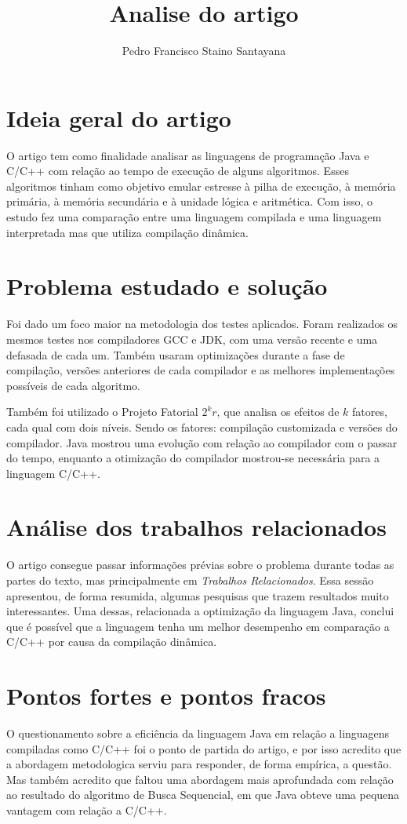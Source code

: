 \documentclass[12pt]{article}
\title{Analise do artigo}
\author{Pedro Francisco Staino Santayana}
\date{}
\begin{document}
\maketitle

\section*{Ideia geral do artigo}
O artigo\cite{inproceedings} tem como finalidade analisar as linguagens de programação Java e C/C++
com relação ao tempo de execução de alguns algoritmos. Esses algoritmos tinham
como objetivo emular estresse à pilha de execução, à memória primária, 
à memória secundária e à unidade lógica e aritmética. Com isso, o estudo fez uma comparação
entre uma linguagem compilada e uma linguagem interpretada mas que utiliza compilação dinâmica.

\section*{Problema estudado e solução}

Foi dado um foco maior na metodologia dos testes aplicados. Foram realizados os mesmos
testes nos compiladores GCC e JDK, com uma versão recente e uma defasada de cada um.
Também usaram optimizações durante a fase de compilação, versões anteriores de cada compilador
e as melhores implementações possíveis de cada algoritmo.

Também foi utilizado o Projeto Fatorial $2^kr$, que analisa os efeitos de $k$ fatores,
cada qual com dois níveis. Sendo os fatores: compilação customizada e 
versões do compilador. Java mostrou uma evolução com relação ao compilador com o passar do tempo,
enquanto a otimização do compilador mostrou-se necessária para a linguagem C/C++. 

\section*{Análise dos trabalhos relacionados}
O artigo consegue passar informações prévias sobre o problema durante todas as partes
do texto, mas principalmente em \textit{Trabalhos Relacionados}. Essa sessão apresentou,
de forma resumida, algumas pesquisas que trazem resultados muito interessantes. Uma dessas, relacionada a optimização da linguagem Java,
conclui que é possível que a linguagem tenha um melhor desempenho em comparação a C/C++
por causa da compilação dinâmica.

\section*{Pontos fortes e pontos fracos}
O questionamento sobre a eficiência da linguagem Java em relação a linguagens compiladas como C/C++
foi o ponto de partida do artigo, e por isso acredito que a abordagem metodologica
serviu para responder, de forma empírica, a questão. Mas também acredito que faltou uma abordagem mais
aprofundada com relação ao resultado do algoritmo de Busca Sequencial, em que Java obteve uma pequena vantagem
com relação a C/C++.
\end{document}
